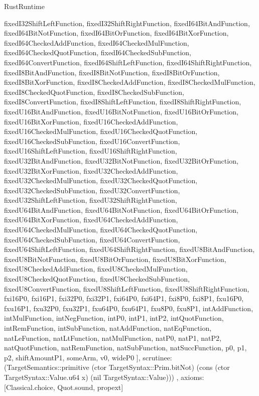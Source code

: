 \begin{lexlean}{RustRuntime}
\begin{semanticmodule}
{{      fixedI32ShiftLeftFunction,
      fixedI32ShiftRightFunction,
      fixedI64BitAndFunction,
      fixedI64BitNotFunction,
      fixedI64BitOrFunction,
      fixedI64BitXorFunction,
      fixedI64CheckedAddFunction,
      fixedI64CheckedMulFunction,
      fixedI64CheckedQuotFunction,
      fixedI64CheckedSubFunction,
      fixedI64ConvertFunction,
      fixedI64ShiftLeftFunction,
      fixedI64ShiftRightFunction,
      fixedI8BitAndFunction,
      fixedI8BitNotFunction,
      fixedI8BitOrFunction,
      fixedI8BitXorFunction,
      fixedI8CheckedAddFunction,
      fixedI8CheckedMulFunction,
      fixedI8CheckedQuotFunction,
      fixedI8CheckedSubFunction,
      fixedI8ConvertFunction,
      fixedI8ShiftLeftFunction,
      fixedI8ShiftRightFunction,
      fixedU16BitAndFunction,
      fixedU16BitNotFunction,
      fixedU16BitOrFunction,
      fixedU16BitXorFunction,
      fixedU16CheckedAddFunction,
      fixedU16CheckedMulFunction,
      fixedU16CheckedQuotFunction,
      fixedU16CheckedSubFunction,
      fixedU16ConvertFunction,
      fixedU16ShiftLeftFunction,
      fixedU16ShiftRightFunction,
      fixedU32BitAndFunction,
      fixedU32BitNotFunction,
      fixedU32BitOrFunction,
      fixedU32BitXorFunction,
      fixedU32CheckedAddFunction,
      fixedU32CheckedMulFunction,
      fixedU32CheckedQuotFunction,
      fixedU32CheckedSubFunction,
      fixedU32ConvertFunction,
      fixedU32ShiftLeftFunction,
      fixedU32ShiftRightFunction,
      fixedU64BitAndFunction,
      fixedU64BitNotFunction,
      fixedU64BitOrFunction,
      fixedU64BitXorFunction,
      fixedU64CheckedAddFunction,
      fixedU64CheckedMulFunction,
      fixedU64CheckedQuotFunction,
      fixedU64CheckedSubFunction,
      fixedU64ConvertFunction,
      fixedU64ShiftLeftFunction,
      fixedU64ShiftRightFunction,
      fixedU8BitAndFunction,
      fixedU8BitNotFunction,
      fixedU8BitOrFunction,
      fixedU8BitXorFunction,
      fixedU8CheckedAddFunction,
      fixedU8CheckedMulFunction,
      fixedU8CheckedQuotFunction,
      fixedU8CheckedSubFunction,
      fixedU8ConvertFunction,
      fixedU8ShiftLeftFunction,
      fixedU8ShiftRightFunction,
      fxi16P0,
      fxi16P1,
      fxi32P0,
      fxi32P1,
      fxi64P0,
      fxi64P1,
      fxi8P0,
      fxi8P1,
      fxu16P0,
      fxu16P1,
      fxu32P0,
      fxu32P1,
      fxu64P0,
      fxu64P1,
      fxu8P0,
      fxu8P1,
      intAddFunction,
      intMulFunction,
      intNegFunction,
      intP0,
      intP1,
      intP2,
      intQuotFunction,
      intRemFunction,
      intSubFunction,
      natAddFunction,
      natEqFunction,
      natLeFunction,
      natLtFunction,
      natMulFunction,
      natP0,
      natP1,
      natP2,
      natQuotFunction,
      natRemFunction,
      natSubFunction,
      natSuccFunction,
      p0,
      p1,
      p2,
      shiftAmountP1,
      someArm,
      v0,
      wideP0
    ],
    scrutinee: (TargetSemantics::primitive (ctor TargetSyntax::Prim.bitNot) (cons (ctor TargetSyntax::Value.u64 x) (nil TargetSyntax::Value)))
  },
  axioms: [Classical.choice, Quot.sound, propext]
}


\end{semanticmodule}
\end{lexlean}

